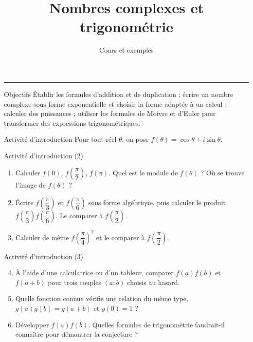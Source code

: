 \documentclass[aspectratio=169,10pt]{beamer}
\title{Nombres complexes et trigonométrie}
\subtitle{Cours et exemples}
\date{}
\author{}
\begin{document}
\begin{frame}[plain]
\vfill
{\inserttitle\par}
\medskip
{\insertsubtitle\par}
\medskip
{\rule{\textwidth}{.5pt}}
\vfill
\end{frame}
\begin{frame}{Objectifs}
Établir les formules d'addition et de duplication ; écrire un nombre complexe sous forme exponentielle et choisir la forme adaptée à un calcul ; calculer des puissances ; utiliser les formules de Moivre et d'Euler pour transformer des expressions trigonométriques.
\end{frame}
\begin{frame}{Activité d'introduction}
Pour tout réel \(\theta\), on pose \(f(\theta)=\cos\theta+i\sin\theta\).
\end{frame}
\begin{frame}{Activité d'introduction (2)}
\begin{enumerate}
\setcounter{enumi}{0}\item Calculer \(f(0)\), \(f\left(\dfrac\pi2\right)\), \(f(\pi)\). Quel est le module de \(f(\theta)\) ? Où se trouve l'image de \(f(\theta)\) ?

\item Écrire \(f\left(\dfrac\pi3\right)\) et \(f\left(\dfrac\pi6\right)\) sous forme algébrique, puis calculer le produit \(f\left(\dfrac\pi3\right)f\left(\dfrac\pi6\right)\). Le comparer à \(f\left(\dfrac\pi2\right)\).

\item Calculer de même \(f\left(\dfrac\pi4\right)^2\) et le comparer à \(f\left(\dfrac\pi2\right)\).

\end{enumerate}
\end{frame}
\begin{frame}{Activité d'introduction (3)}
\begin{enumerate}
\setcounter{enumi}{3}\item À l'aide d'une calculatrice ou d'un tableur, comparer \(f(a)f(b)\) et \(f(a+b)\) pour trois couples \((a;b)\) choisis au hasard.

\item Quelle fonction connue vérifie une relation du même type, \(g(a)g(b)=g(a+b)\) et \(g(0)=1\) ?

\item Développer \(f(a)f(b)\). Quelles formules de trigonométrie faudrait-il connaître pour démontrer la conjecture ?

\end{enumerate}
\end{frame}
\end{document}
